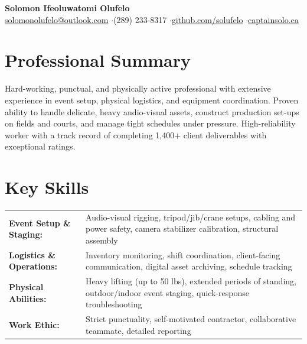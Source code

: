 \documentclass[a4paper,10pt]{article}
\begin{document}
\begin{center}
    {\LARGE \textbf{Solomon Ifeoluwatomi Olufelo}} \\[2pt]
    \href{mailto:solomonolufelo@outlook.com}{solomonolufelo@outlook.com} \enspace$\cdot$\enspace (289) 233-8317 \enspace$\cdot$\enspace \href{https://github.com/solufelo}{github.com/solufelo} \enspace$\cdot$\enspace \href{https://captainsolo.ca}{captainsolo.ca}
\end{center}

\section*{Professional Summary}
Hard-working, punctual, and physically active professional with extensive experience in event setup, physical logistics, and equipment coordination. Proven ability to handle delicate, heavy audio-visual assets, construct production set-ups on fields and courts, and manage tight schedules under pressure. High-reliability worker with a track record of completing 1,400+ client deliverables with exceptional ratings.

\section*{Key Skills}
\begin{tabularx}{\textwidth}{@{}lX@{}}
\textbf{Event Setup \& Staging:} & Audio-visual rigging, tripod/jib/crane setups, cabling and power safety, camera stabilizer calibration, structural assembly \\
\textbf{Logistics \& Operations:} & Inventory monitoring, shift coordination, client-facing communication, digital asset archiving, schedule tracking \\
\textbf{Physical Abilities:} & Heavy lifting (up to 50 lbs), extended periods of standing, outdoor/indoor event staging, quick-response troubleshooting \\
\textbf{Work Ethic:} & Strict punctuality, self-motivated contractor, collaborative teammate, detailed reporting \\
\end{tabularx}
\end{document}
